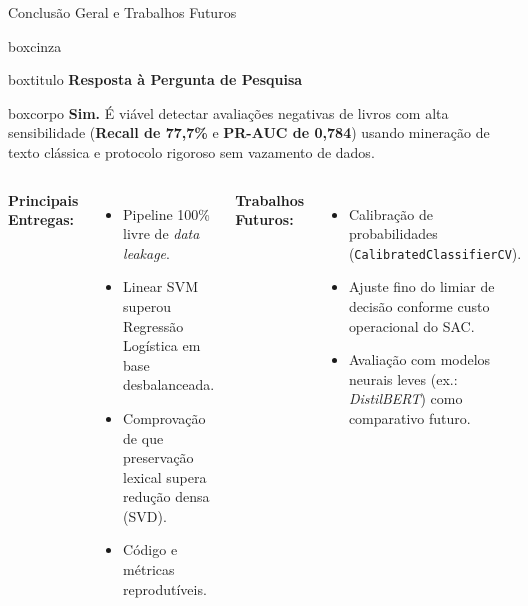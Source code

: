 \documentclass[aspectratio=43]{beamer}
\begin{document}
\begin{frame}[t]{Conclusão Geral e Trabalhos Futuros}

\vspace{0.1cm}

\begin{center}
\begin{beamercolorbox}[wd=0.96\textwidth, sep=0pt]{boxcinza}
  \begin{beamercolorbox}[wd=0.96\textwidth, ht=0.45cm, dp=0.08cm, leftskip=0.2cm]{boxtitulo}
    {\color{uelgreen}\normalsize\textbf{Resposta à Pergunta de Pesquisa}}
  \end{beamercolorbox}
  \begin{beamercolorbox}[wd=0.96\textwidth, sep=0.22cm]{boxcorpo}
    \small \textbf{Sim.} É viável detectar avaliações negativas de livros com alta sensibilidade (\textbf{Recall de 77,7\%} e \textbf{PR-AUC de 0,784}) usando mineração de texto clássica e protocolo rigoroso sem vazamento de dados.
  \end{beamercolorbox}
\end{beamercolorbox}
\end{center}

\vspace{0.25cm}

\scriptsize
\begin{columns}[T]
\textbf{Principais Entregas:}
\begin{itemize}
    \item Pipeline 100\% livre de \textit{data leakage}.
    \item Linear SVM superou Regressão Logística em base desbalanceada.
    \item Comprovação de que preservação lexical supera redução densa (SVD).
    \item Código e métricas reprodutíveis.
\end{itemize}

\textbf{Trabalhos Futuros:}
\begin{itemize}
    \item Calibração de probabilidades (\texttt{CalibratedClassifierCV}).
    \item Ajuste fino do limiar de decisão conforme custo operacional do SAC.
    \item Avaliação com modelos neurais leves (ex.: \textit{DistilBERT}) como comparativo futuro.
\end{itemize}
\end{columns}

\end{frame}
\end{document}
